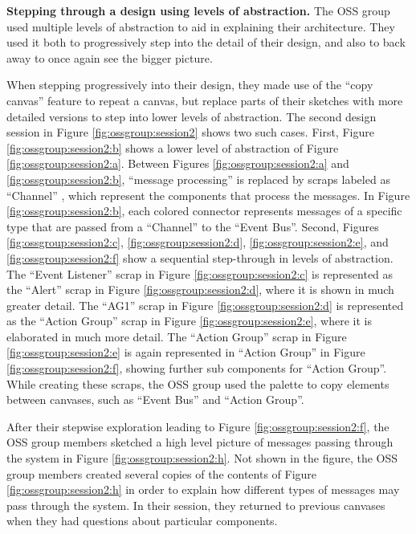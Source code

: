 \documentclass[12pt,fleqn]{ucithesis}
\begin{document}
\textbf{Stepping through a design using levels of abstraction. } The OSS group used multiple levels of abstraction to aid in explaining their architecture. They used it both to progressively step into the detail of their design, and also to back away to once again see the bigger picture.

When stepping progressively into their design, they made use of the ``copy canvas'' feature to repeat a canvas, but replace parts of their sketches with more detailed versions to step into lower levels of abstraction. The second design session in Figure \ref{fig:ossgroup:session2} shows two such cases. First, Figure \ref{fig:ossgroup:session2:b} shows a lower level of abstraction of Figure \ref{fig:ossgroup:session2:a}. Between Figures \ref{fig:ossgroup:session2:a} and \ref{fig:ossgroup:session2:b}, ``message processing'' is replaced by scraps labeled as ``Channel'' , which represent the components that process the messages.  In Figure \ref{fig:ossgroup:session2:b}, each colored connector represents messages of a specific type that are passed from a ``Channel'' to the ``Event Bus''. Second,  Figures \ref{fig:ossgroup:session2:c}, \ref{fig:ossgroup:session2:d}, \ref{fig:ossgroup:session2:e}, and \ref{fig:ossgroup:session2:f} show a sequential step-through in levels of abstraction. The ``Event Listener'' scrap in Figure \ref{fig:ossgroup:session2:c} is represented as the ``Alert'' scrap in Figure \ref{fig:ossgroup:session2:d}, where it is shown in much greater detail. The ``AG1'' scrap in Figure \ref{fig:ossgroup:session2:d} is represented as the ``Action Group'' scrap in Figure \ref{fig:ossgroup:session2:e}, where it is elaborated in much more detail. The ``Action Group'' scrap in Figure \ref{fig:ossgroup:session2:e} is again represented in ``Action Group'' in Figure \ref{fig:ossgroup:session2:f}, showing further sub components for ``Action Group''. While creating these scraps, the OSS group used the palette to copy elements between canvases, such as ``Event Bus'' and ``Action Group''.

After their stepwise exploration leading to Figure \ref{fig:ossgroup:session2:f}, the OSS group members sketched a high level picture of messages passing through the system in Figure \ref{fig:ossgroup:session2:h}. Not shown in the figure, the OSS group members created several copies of the contents of Figure \ref{fig:ossgroup:session2:h} in order to explain how different types of messages may pass through the system. In their session, they returned to previous canvases when they had questions about particular components.
\end{document}
